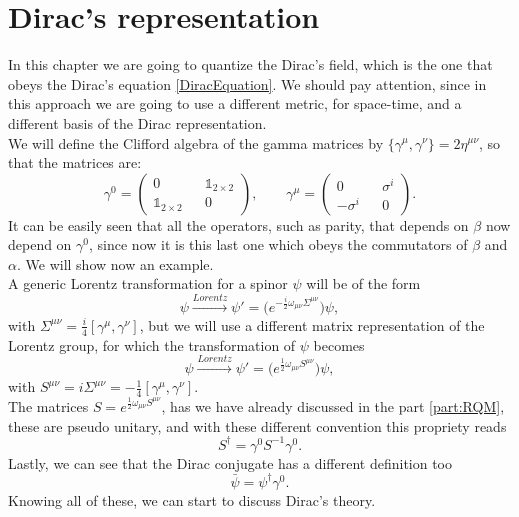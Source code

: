 \section{Dirac's representation}
In this chapter we are going to quantize the Dirac's field, which is the one that obeys the Dirac's equation \eqref{DiracEquation}. We should pay attention, since in this approach we are going to use a different metric, for space-time, and a different basis of the Dirac representation.\\
We will define the Clifford algebra of the gamma matrices by $\{\gamma^\mu,\gamma^\nu\}=2\eta^{\mu\nu}$, so that the matrices are:
\begin{equation*}
    \gamma^0=\begin{pmatrix}
        0&&\mathds{1}_{2\times2}\\
        \mathds{1}_{2\times2}&&0
    \end{pmatrix},
    \qquad\gamma^\mu=\begin{pmatrix}
        0&&\sigma^i\\
        -\sigma^i&&0
    \end{pmatrix}.
\end{equation*}
It can be easily seen that all the operators, such as parity, that depends on $\beta$ now depend on $\gamma^0$, since now it is this last one which obeys the commutators of $\beta$ and $\alpha$. We will show now an example.\\
A generic Lorentz transformation for a spinor $\psi$ will be of the form
\begin{equation*}
    \psi\xrightarrow{Lorentz}\psi'=\bigg(e^{-\frac{i}{2}\omega_{\mu\nu}\Sigma^{\mu\nu}}\bigg)\psi,
\end{equation*}
with $\Sigma^{\mu\nu}=\frac{i}{4}[\gamma^\mu,\gamma^\nu]$, but we will use a different matrix representation of the Lorentz group, for which the transformation of $\psi$ becomes
\begin{equation*}
    \psi\xrightarrow{Lorentz}\psi'=\bigg(e^{\frac{1}{2}\omega_{\mu\nu}S^{\mu\nu}}\bigg)\psi,
\end{equation*}
with $S^{\mu\nu}=i\Sigma^{\mu\nu}=-\frac{1}{4}[\gamma^\mu,\gamma^\nu]$.\\The matrices $S=e^{\frac{1}{2}\omega_{\mu\nu}S^{\mu\nu}}$, has we have already discussed in the part \ref{part:RQM}, these are pseudo unitary, and with these different convention this propriety reads
\begin{equation*}
    S^{\dagger}=\gamma^0S^{-1}\gamma^0.
\end{equation*}
Lastly, we can see that the Dirac conjugate has a different definition too
\begin{equation*}
    \bar\psi=\psi^\dagger\gamma^0.
\end{equation*}
Knowing all of these, we can start to discuss Dirac's theory.
